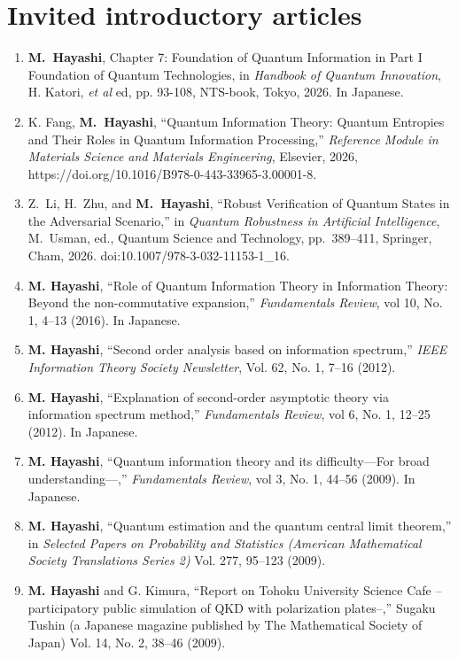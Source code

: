 \documentclass[a4paper,12pt,oneside]{article}
\begin{document}
\section{Invited introductory articles}
\begin{enumerate}

\item
\textbf{M.~Hayashi},
Chapter 7: Foundation of Quantum Information in Part I Foundation of Quantum Technologies,
in \emph{Handbook of Quantum Innovation},
H. Katori, {\it et al} ed,
pp. 93-108,
NTS-book, Tokyo, 2026.
In Japanese. 

\item
K. Fang, \textbf{M.~Hayashi},
``Quantum Information Theory: Quantum Entropies and Their Roles in Quantum Information Processing,''
{\em Reference Module in Materials Science and Materials Engineering},
Elsevier, 2026,
https://doi.org/10.1016/B978-0-443-33965-3.00001-8.

\item
Z.~Li, H.~Zhu, and \textbf{M.~Hayashi},
``Robust Verification of Quantum States in the Adversarial Scenario,''
in \emph{Quantum Robustness in Artificial Intelligence},
M.~Usman, ed.,
Quantum Science and Technology,
pp.~389--411,
Springer, Cham, 2026.
doi:10.1007/978-3-032-11153-1\_16.

\item 
\textbf{M. Hayashi},
``Role of Quantum Information Theory in Information Theory:
Beyond the non-commutative expansion,''
{\em Fundamentals Review}, vol 10, No. 1,  4--13 (2016). 
In Japanese. 


\item 
\textbf{M. Hayashi}, ``Second order analysis based on information spectrum,'' 
{\em IEEE Information Theory Society Newsletter}, Vol. 62, No. 1, 7--16 (2012). 

\item 
\textbf{M. Hayashi},
``Explanation of second-order asymptotic theory via information spectrum method,''
{\em Fundamentals Review}, vol 6, No. 1, 12--25 (2012). 
In Japanese. 

\item 
\textbf{M. Hayashi},
``Quantum information theory and its difficulty---For broad understanding---,''
{\em Fundamentals Review}, vol 3, No. 1, 44--56 (2009). 
In Japanese. 

\item 
\textbf{M. Hayashi}, 
``Quantum estimation and the quantum central limit theorem,'' 
in 
{\em Selected Papers on Probability and Statistics (American Mathematical Society Translations Series 2)} Vol. 277, 95--123 (2009). 

\item 
\textbf{M. Hayashi} and G. Kimura,
``Report on Tohoku University Science Cafe -- 
participatory public simulation of QKD with polarization plates--,'' 
Sugaku Tushin (a Japanese magazine published by The Mathematical Society of Japan)
Vol. 14, No. 2, 38--46 (2009).

\end{enumerate}
\end{document}
